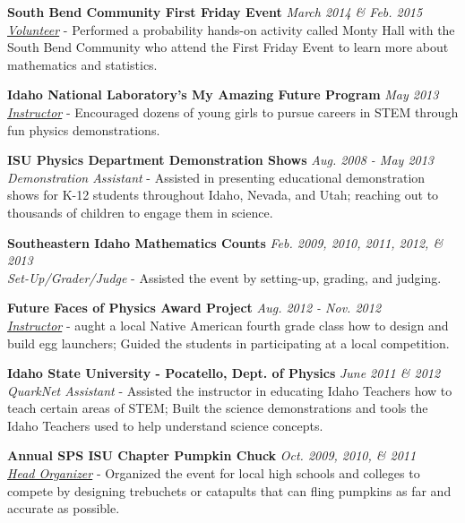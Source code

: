 \documentclass[11pt, letterpaper, roman]{moderncv} %
\newcommand{\outreachspace}{\vspace{5pt}}
\begin{document}
\outreachspace
\textbf{South Bend Community First Friday Event} \hfill \textit{March 2014 \& Feb. 2015}\\
\textit{\href{http://acms.nd.edu/news/47182-acms-first-friday-mad-about-science/}{Volunteer}} - Performed a probability hands-on activity called Monty Hall with the South Bend Community who attend the First Friday Event to learn more about mathematics and statistics.

\outreachspace
\textbf{Idaho National Laboratory's My Amazing Future Program} \hfill \textit{May 2013}\\
\textit{\href{https://inlportal.inl.gov/portal/server.pt?open=514&objID=1269&mode=2&featurestory=DA_575131}{Instructor}} - Encouraged dozens of young girls to pursue careers in STEM through fun physics demonstrations. 

\outreachspace
\textbf{ISU Physics Department Demonstration Shows} \hfill \textit{Aug. 2008 - May 2013}\\
\textit{Demonstration Assistant} - Assisted in presenting educational demonstration shows for K-12 students throughout Idaho, Nevada, and Utah; reaching out to thousands of children to engage them in science.

\outreachspace
\textbf{Southeastern Idaho Mathematics Counts} \hfill \textit{Feb. 2009, 2010, 2011, 2012, \& 2013}\\
\textit{Set-Up/Grader/Judge} - Assisted the event by setting-up, grading, and judging.

\outreachspace
\textbf{Future Faces of Physics Award Project} \hfill \textit{Aug. 2012 - Nov. 2012}\\
\textit{\href{http://www.spsnational.org/programs/awards/2012/FFoP/ffop_recipients.htm}{Instructor}} - aught a local Native American fourth grade class how to design and build egg launchers; Guided the students in participating at a local competition.

\outreachspace
\textbf{Idaho State University - Pocatello, Dept. of Physics} \hfill \textit{June 2011 \& 2012}\\
\textit{QuarkNet Assistant} - Assisted the instructor in educating Idaho Teachers how to teach certain areas of STEM; Built the science demonstrations and tools the Idaho Teachers used to help understand science concepts.

\outreachspace
\textbf{Annual SPS ISU Chapter Pumpkin Chuck} \hfill \textit{Oct. 2009, 2010, \& 2011}\\
\textit{\href{http://www.idahostatejournal.com/news/local/article_845b6364-cc47-11de-b59c-001cc4c002e0.html}{Head Organizer}} - Organized the event for local high schools and colleges to compete by designing trebuchets or catapults that can fling pumpkins as far and accurate as possible.
\end{document}
